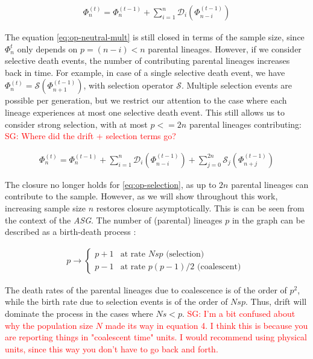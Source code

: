 \documentclass[review]{elsarticle}
\newcommand{\ra}{\rightarrow}
\newcommand{\sgcomment}[1]{\textcolor{red}{SG: #1}}
\begin{document}
\begin{align}
  \label{eq:op-neutral-mult}
  \Phi_{n}^{(t)}=\Phi_{n}^{(t-1)}+\sum_{i=1}^{n}\mathcal{D}_i(\Phi_{n-i}^{(t-1)})
\end{align}

The equation \eqref{eq:op-neutral-mult} is still closed in terms of the sample size, since
$\Phi_{n}^{t}$ only depends on $p=(n-i)<n$ parental lineages. However, if we consider
selective death events, the number of contributing parental lineages increases back in time. For
example, in case of a single selective death event, we have
$\Phi_{n}^{(t)}=\mathcal{S}(\Phi_{n+1}^{(t-1)})$, with selection operator $\mathcal{S}$. Multiple
selection events are possible per generation, but we restrict our attention to the case where each
lineage experiences at most one selective death event. This still allows us to consider strong
selection, with at most $p<=2n$ parental lineages contributing: \sgcomment{Where did the drift + selection terms go?}

\begin{align}
  \label{eq:op-selection}
  \Phi_{n}^{(t)}=\Phi_{n}^{(t-1)}+\sum_{i=1}^{n}\mathcal{D}_i(\Phi_{n-i}^{(t-1)}) + \sum_{j=0}^{2n}\mathcal{S}_j(\Phi_{n+j}^{(t-1)})
\end{align}

The closure no longer holds for \eqref{eq:op-selection}, as up to $2n$ parental lineages can
contribute to the sample. However, as we will show throughout this work, increasing sample size $n$
restores closure asymptotically. This is can be seen from the context of the \textit{ASG}. The
number of (parental) lineages $p$ in the graph can be described as a birth-death process
\cite{KroneNeuhauser1997, Wakeley2009}:

\begin{align}
  \label{eq:asg-size}
  p \ra \begin{cases}
      p+1 & \text{at rate } Nsp  \text{ (selection) }\\
      p-1 & \text{at rate } p (p-1)/2 \text{ (coalescent) }
    \end{cases}
\end{align}

The death rates of the parental lineages due to coalescence is of the order of $p^2$, while the
birth rate due to selection events is of the order of $Nsp$. Thus, drift will dominate the process in
the cases where $Ns < p$. \sgcomment{I'm a bit confused about why the population size $N$ made its way in equation 4. I think this is because you are reporting things in "coalescent time" units. I would recommend using physical units, since this way you don't have to go back and forth.  }
\end{document}

